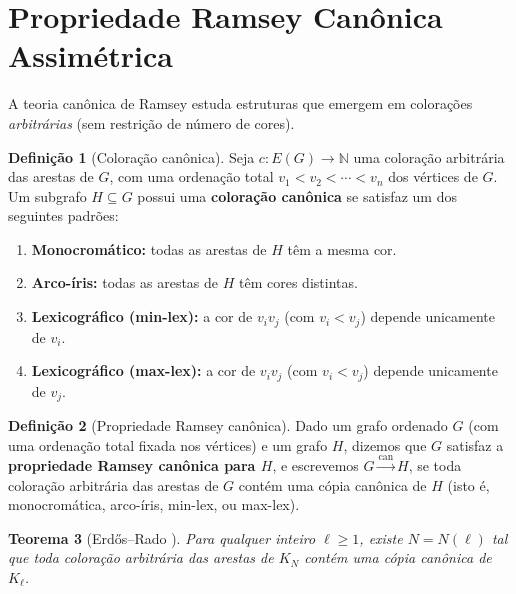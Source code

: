 \documentclass[reqno, 12pt]{amsart}
\numberwithin{equation}{section}
\theoremstyle{plain}
\newtheorem{theorem}{Teorema}[section]
\theoremstyle{definition}
\newtheorem{definition}[theorem]{Definição}
\begin{document}
\section{Propriedade Ramsey Canônica Assimétrica} \label{sec:canonico}

A teoria canônica de Ramsey estuda estruturas que emergem em colorações
\emph{arbitrárias} (sem restrição de número de cores).

\begin{definition}[Coloração canônica]
    \label{def:canonica}
    Seja $c : E(G) \to \mathbb{N}$ uma coloração arbitrária das arestas de $G$,
    com uma ordenação total $v_1 < v_2 < \cdots < v_n$ dos vértices de $G$.
    Um subgrafo $H \subseteq G$ possui uma \textbf{coloração canônica} se
    satisfaz um dos seguintes padrões:
    \begin{enumerate}
        \item \textbf{Monocromático:} todas as arestas de $H$ têm a mesma cor.
        \item \textbf{Arco-íris:} todas as arestas de $H$ têm cores distintas.
        \item \textbf{Lexicográfico (min-lex):} a cor de $v_iv_j$ (com $v_i < v_j$)
              depende unicamente de $v_i$.
        \item \textbf{Lexicográfico (max-lex):} a cor de $v_iv_j$ (com $v_i < v_j$)
              depende unicamente de $v_j$.
    \end{enumerate}
\end{definition}

\begin{definition}[Propriedade Ramsey canônica]
    \label{def:prop-canonica}
    Dado um grafo ordenado $G$ (com uma ordenação total fixada nos vértices) e um grafo $H$,
    dizemos que $G$ satisfaz a \textbf{propriedade Ramsey canônica para $H$},
    e escrevemos $G \xrightarrow{\mathrm{can}} H$, se toda coloração arbitrária das arestas de $G$
    contém uma cópia canônica de $H$ (isto é, monocromática, arco-íris, min-lex, ou max-lex).
\end{definition}

\begin{theorem}[Erdős--Rado \cite{erdos1950combinatorial}]
    Para qualquer inteiro $\ell \ge 1$, existe $N = N(\ell)$ tal que toda coloração
    arbitrária das arestas de $K_N$ contém uma cópia canônica de $K_\ell$.
\end{theorem}
\end{document}
